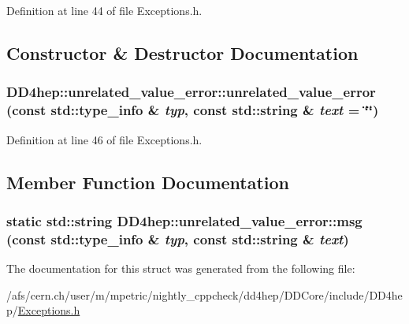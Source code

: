 Definition at line 44 of file Exceptions.h.

\subsection{Constructor \& Destructor Documentation}
\hypertarget{struct_d_d4hep_1_1unrelated__value__error_adb6fa7ac7ea37b8575dd0550a197555b}{
\subsubsection[{unrelated\_\-value\_\-error}]{\setlength{\rightskip}{0pt plus 5cm}DD4hep::unrelated\_\-value\_\-error::unrelated\_\-value\_\-error (const std::type\_\-info \& {\em typ}, \/  const std::string \& {\em text} = {\ttfamily \char`\"{}\char`\"{}})}}
\label{struct_d_d4hep_1_1unrelated__value__error_adb6fa7ac7ea37b8575dd0550a197555b}


Definition at line 46 of file Exceptions.h.

\subsection{Member Function Documentation}
\hypertarget{struct_d_d4hep_1_1unrelated__value__error_aa0d34096b68f05f08f3dbe3a875e8cda}{
\subsubsection[{msg}]{\setlength{\rightskip}{0pt plus 5cm}static std::string DD4hep::unrelated\_\-value\_\-error::msg (const std::type\_\-info \& {\em typ}, \/  const std::string \& {\em text})}}
\label{struct_d_d4hep_1_1unrelated__value__error_aa0d34096b68f05f08f3dbe3a875e8cda}


The documentation for this struct was generated from the following file:\begin{DoxyCompactItemize}
\item 
/afs/cern.ch/user/m/mpetric/nightly\_\-cppcheck/dd4hep/DDCore/include/DD4hep/\hyperlink{_d_d_core_2include_2_d_d4hep_2_exceptions_8h}{Exceptions.h}\end{DoxyCompactItemize}
